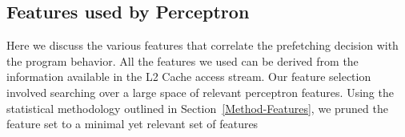 \subsection{Features used by Perceptron}
\label{Impl-Features}
Here we discuss the various features that correlate the prefetching
decision with the program behavior. All the features we used can be 
derived from the information available in the L2 Cache access stream.
Our feature selection involved searching over a large space of 
relevant perceptron features. Using the statistical methodology 
outlined in Section~\ref{Method-Features}, we pruned the feature 
set to a minimal yet relevant set of features



